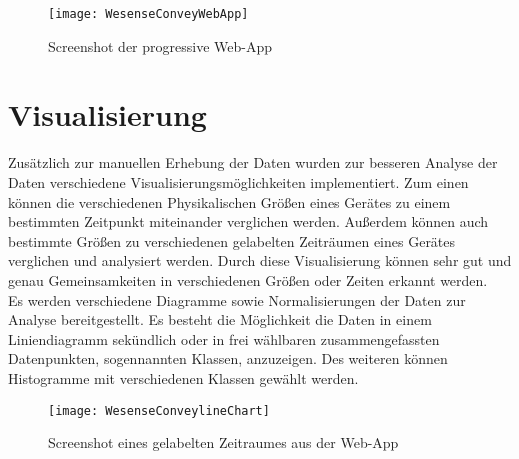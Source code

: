         \begin{figure}[h]
            \centering
            \texttt{[image: WesenseConveyWebApp]}
            \caption{Screenshot der progressive Web-App}
            \label{fig:WebApp1}
        \end{figure}

\section{Visualisierung}\label{VisualisierungWebApp}

        Zusätzlich zur manuellen Erhebung der Daten wurden zur besseren Analyse der Daten verschiedene Visualisierungsmöglichkeiten implementiert.
        Zum einen können die verschiedenen Physikalischen Größen eines Gerätes zu einem bestimmten Zeitpunkt miteinander verglichen werden.
        Außerdem können auch bestimmte Größen zu verschiedenen gelabelten Zeiträumen eines Gerätes verglichen und analysiert werden. 
        Durch diese Visualisierung können sehr gut und genau Gemeinsamkeiten in verschiedenen Größen oder Zeiten erkannt werden.\\
        \newline
        Es werden verschiedene Diagramme sowie Normalisierungen der Daten zur Analyse bereitgestellt.
        Es besteht die Möglichkeit die Daten in einem Liniendiagramm sekündlich oder in frei wählbaren zusammengefassten Datenpunkten, sogennannten Klassen, anzuzeigen.
        Des weiteren können Histogramme mit verschiedenen Klassen gewählt werden.

        \begin{figure}[h]
            \centering
            \texttt{[image: WesenseConveylineChart]}
            \caption{Screenshot eines gelabelten Zeitraumes aus der Web-App}
            \label{fig:WebApp2}
        \end{figure}
